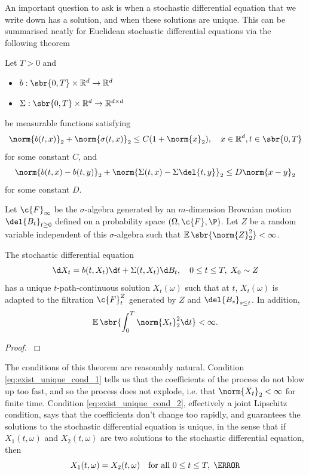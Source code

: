 An important question to ask is when a stochastic differential equation that we write down has a solution, and when these solutions are unique.
This can be summarised neatly for Euclidean stochastic differential equations via the following theorem \begin{theorem}\label{thm:sde_solution_exist_unique} Let \(T >0\) and \begin{itemize}[noitemsep] \item \(b: \sbr{0, T} \times \R^d \to \R^d\) \item \(\Sigma: \sbr{0, T} \x \R^d \to \R^{d \times d}\) \end{itemize} be measurable functions satisfying \[\norm{b(t, x)}_2 + \norm{\sigma(t, x)}_2 \leq C(1 + \norm{x}_2), \quad x\in\R^d, t\in\sbr{0,T} \label{eq:exist_unique_cond_1}\] for some constant \(C\), and \[\norm{b(t, x) - b(t, y)}_2 + \norm{\Sigma(t, x) - \Sigma\del{t, y}}_2 \leq D\norm{x-y}_2 \label{eq:exist_unique_cond_2}\] for some constant \(D\).
	
	Let \(\c{F}_\infty\) be the \(\sigma\)-algebra generated by an \(m\)-dimension Brownian motion \(\del{B_t}_{t\geq 0}\) defined on a probability space \((\Omega, \c{F}, \P)\).
	Let \(Z\) be a random variable independent of this \(\sigma\)-algebra such that \(\E\sbr{\norm{Z}_2^2} < \infty\).

	The stochastic differential equation \[\d X_t = b(t, X_t) \d t + \Sigma(t, X_t) \d B_t, \quad 0\leq t\leq T, \; X_0 \sim Z\] has a unique \(t\)-path-continuous solution \(X_t(\omega)\) such that at \(t\), \(X_t(\omega)\) is adapted to the filtration \(\c{F}_t^Z\) generated by \(Z\) and \(\del{B_s}_{s\leq t}\).
	In addition, \[\E\sbr{\int_0^T \norm{X_t}_2^2 \d t} < \infty .
	\]
\end{theorem}\begin{proof}
	\textcite[theorem 5.2.1]{oksendal2003stochastic}
\end{proof}
The conditions of this theorem are reasonably natural.
Condition \ref{eq:exist_unique_cond_1} tells us that the coefficients of the process do not blow up too fast, and so the process does not explode, i.e. that \(\norm{X_t}_2 < \infty\) for finite time.
Condition \ref{eq:exist_unique_cond_2}, effectively a joint Lipschitz condition, says that the coefficients don't change too rapidly, and guarantees the solutions to the stochastic differential equation is unique, in the sense that if \(X_1(t, \omega)\) and \(X_2(t, \omega)\) are two solutions to the stochastic differential equation, then \[X_1(t, \omega) = X_2(t, \omega)\quad \text{for all } 0 \leq t \leq T, \; \as \] 

